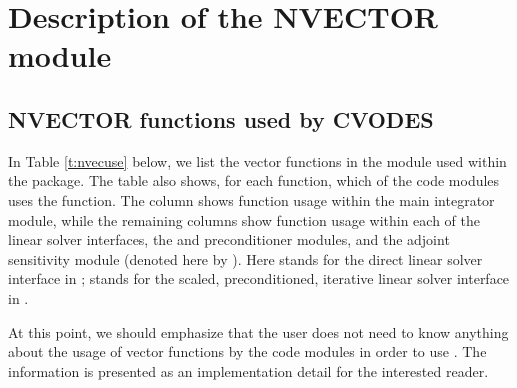 \chapter{Description of the NVECTOR module}\label{s:nvector}



\section{NVECTOR functions used by CVODES}

In Table \ref{t:nvecuse} below, we list the vector functions in the 
{\nvector} module used within the {\cvodes} package.
The table also shows, for each function, which of the code modules uses
the function. The {\cvodes} column shows function usage within the main
integrator module, while the remaining columns show function usage
within each of the {\cvodes} linear solver interfaces, the {\cvbandpre} and
{\cvbbdpre} preconditioner modules, and the {\cvodes} adjoint sensitivity
module (denoted here by {\cvodea}).  Here
{\cvdls} stands for the direct linear solver interface in {\cvodes};
{\cvspils} stands for the scaled, preconditioned, iterative linear
solver interface in {\cvodes}.

At this point, we should emphasize that the {\cvodes} user does not need to know 
anything about the usage of vector functions by the {\cvodes} code modules in order 
to use {\cvodes}. The information is presented as an implementation detail for the 
interested reader.

